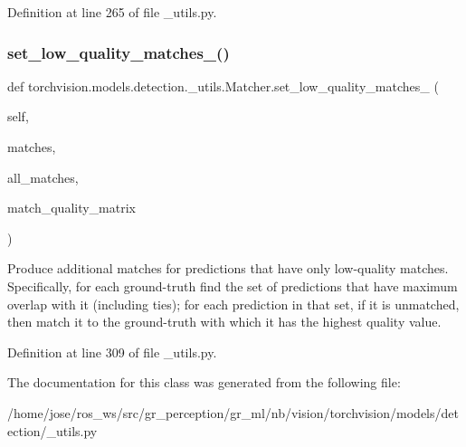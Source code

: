 Definition at line 265 of file \+\_\+utils.\+py.

\mbox{\label{classtorchvision_1_1models_1_1detection_1_1__utils_1_1Matcher_aa99b84bf2c4673c06a5674f75cf8a2e7}} 
\subsubsection{\texorpdfstring{set\+\_\+low\+\_\+quality\+\_\+matches\+\_\+()}{set\_low\_quality\_matches\_()}}
{\footnotesize\ttfamily def torchvision.\+models.\+detection.\+\_\+utils.\+Matcher.\+set\+\_\+low\+\_\+quality\+\_\+matches\+\_\+ (\begin{DoxyParamCaption}\item[{}]{self,  }\item[{}]{matches,  }\item[{}]{all\+\_\+matches,  }\item[{}]{match\+\_\+quality\+\_\+matrix }\end{DoxyParamCaption})}

\begin{DoxyVerb}Produce additional matches for predictions that have only low-quality matches.
Specifically, for each ground-truth find the set of predictions that have
maximum overlap with it (including ties); for each prediction in that set, if
it is unmatched, then match it to the ground-truth with which it has the highest
quality value.
\end{DoxyVerb}
 

Definition at line 309 of file \+\_\+utils.\+py.



The documentation for this class was generated from the following file\+:\begin{DoxyCompactItemize}
\item 
/home/jose/ros\+\_\+ws/src/gr\+\_\+perception/gr\+\_\+ml/nb/vision/torchvision/models/detection/\+\_\+utils.\+py\end{DoxyCompactItemize}

